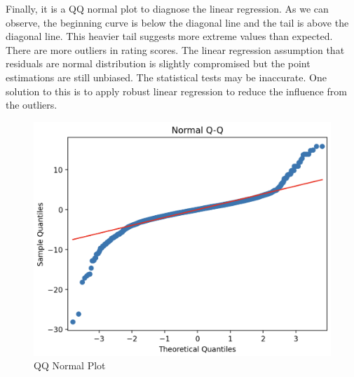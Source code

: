 \documentclass{article}
\begin{document}
Finally, it is a QQ normal plot to diagnose the linear regression. As we can observe, the beginning curve is below the diagonal line and the tail is above the diagonal line. This heavier tail suggests more extreme values than expected. There are more outliers in rating scores. The linear regression assumption that residuals are normal distribution is slightly compromised but the point estimations are still unbiased. The statistical tests may be inaccurate. One solution to this is to apply robust linear regression to reduce the influence from the outliers. 
\begin{figure}
    \centering
    \includegraphics[width=0.3\linewidth]{QQ.png}
    \caption{QQ Normal Plot}
    \label{fig:placeholder}
\end{figure}
\end{document}
